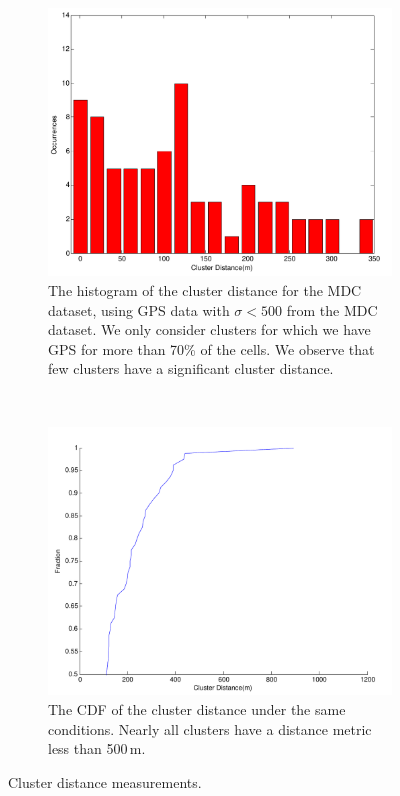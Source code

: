 \documentclass[letterpaper, 12pt, conference]{ieeeconf}
\begin{document}
\begin{figure}
        \centering
        \begin{subfigure}[t]{0.48\textwidth}
                \centering
                \includegraphics[width=\textwidth]{figs/cluster_distance_hist}
                \caption{The histogram of the cluster distance for the MDC 
dataset, using GPS data with $\sigma < 500$ from the MDC dataset. We only 
consider clusters for which we have GPS for more than 70\% of the cells. We 
observe that few clusters have a significant cluster distance.}
                \label{fig:cluster_distance_hist}
        \end{subfigure}%
        ~ %
        \begin{subfigure}[t]{0.48\textwidth}
                \centering
                \includegraphics[width=\textwidth]{figs/cluster_distance_cdf}
                \caption{The CDF of the cluster distance under the same 
conditions. Nearly all clusters have a distance metric less than 500\,m.}
                \label{fig:cluster_distance_cdf}
        \end{subfigure}
				\caption{Cluster distance measurements.}\label{fig:cluster_distance}
\end{figure}
\end{document}
